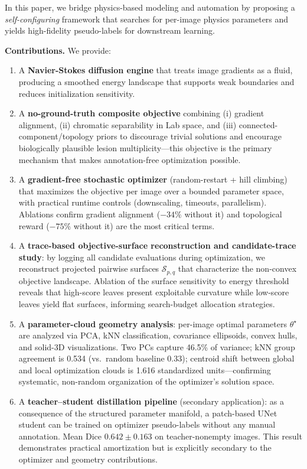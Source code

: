 \documentclass[11pt,a4paper]{article}
\begin{document}
In this paper, we bridge physics-based modeling and automation by proposing a \emph{self-configuring} framework that searches for per-image physics parameters and yields high-fidelity pseudo-labels for downstream learning.

\textbf{Contributions.} We provide:
\begin{enumerate}
    \item A \textbf{Navier-Stokes diffusion engine} that treats image gradients as a fluid, producing a smoothed energy landscape that supports weak boundaries and reduces initialization sensitivity.
    \item A \textbf{no-ground-truth composite objective} combining (i) gradient alignment, (ii) chromatic separability in Lab space, and (iii) connected-component/topology priors to discourage trivial solutions and encourage biologically plausible lesion multiplicity---this objective is the primary mechanism that makes annotation-free optimization possible.
    \item A \textbf{gradient-free stochastic optimizer} (random-restart + hill climbing) that maximizes the objective per image over a bounded parameter space, with practical runtime controls (downscaling, timeouts, parallelism). Ablations confirm gradient alignment ($-34\%$ without it) and topological reward ($-75\%$ without it) are the most critical terms.
    \item A \textbf{trace-based objective-surface reconstruction and candidate-trace study}: by logging all candidate evaluations during optimization, we reconstruct projected pairwise surfaces $\mathcal{S}_{p,q}$ that characterize the non-convex objective landscape. Ablation of the surface sensitivity to energy threshold reveals that high-score leaves present exploitable curvature while low-score leaves yield flat surfaces, informing search-budget allocation strategies.
    \item A \textbf{parameter-cloud geometry analysis}: per-image optimal parameters $\theta^\star$ are analyzed via PCA, kNN classification, covariance ellipsoids, convex hulls, and solid-3D visualizations. Two PCs capture 46.5\% of variance; kNN group agreement is 0.534 (vs.\ random baseline 0.33); centroid shift between global and local optimization clouds is 1.616 standardized units---confirming systematic, non-random organization of the optimizer's solution space.
    \item A \textbf{teacher--student distillation pipeline} (secondary application): as a consequence of the structured parameter manifold, a patch-based UNet student can be trained on optimizer pseudo-labels without any manual annotation. Mean Dice $0.642\pm0.163$ on teacher-nonempty images. This result demonstrates practical amortization but is explicitly secondary to the optimizer and geometry contributions.
\end{enumerate}
\end{document}
